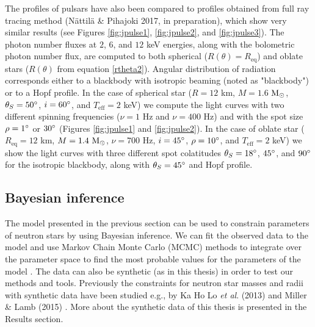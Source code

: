 \documentclass{wihuri}
\def\msun{{\rm M_{\odot}}}
\def\thetas{\theta_{S}}
\def\req{R_{\mathrm{eq}}}
\begin{document}
The profiles of pulsars have also been compared to profiles obtained from full ray tracing method (Nättilä \& Pihajoki 2017, in preparation), which show very similar results (see Figures \ref{fig:jpulse1}, \ref{fig:jpulse2}, and \ref{fig:jpulse3}). %
The photon number fluxes at $2$, $6$, and $12$ keV energies, along with the bolometric photon number flux, are computed to both spherical ($R(\theta) = \req$) and oblate stars ($R(\theta)$ from equation \ref{rtheta2}). Angular distribution of radiation corresponds either to a blackbody with isotropic beaming (noted as "blackbody") or to a Hopf profile. %
In the case of spherical star ($R = 12$ km, $M = 1.6$ $\msun$, $\thetas = 50 \degree$, $i = 60 \degree$, and $T_{\mathrm{eff}} = 2$ keV) we compute the light curves with two different spinning frequencies ($\nu = 1$ Hz and $\nu = 400$ Hz) and with the spot size $\rho = 1 \degree$ or $30 \degree$ (Figures \ref{fig:jpulse1} and \ref{fig:jpulse2}). In the case of oblate star ($\req = 12$ km, $M = 1.4  ~\msun$, $\nu = 700$ Hz, $i = 45 \degree$, $\rho = 10 \degree$, and $T_{\mathrm{eff}} = 2$ keV) we show the light curves with three different spot colatitudes $\thetas  = 18 \degree$,   $45 \degree$, and $90 \degree$ for the isotropic blackbody, along with $\thetas = 45 \degree$ and Hopf profile.









\subsection{Bayesian inference}



The model presented in the previous section can be used to constrain parameters of neutron stars by using Bayesian inference. We can fit the observed data to the model and use Markov Chain Monte Carlo (MCMC) methods to integrate over the parameter space to find the most probable values for the parameters of the model \cite{mc_methods_book}. The data can also be synthetic (as in this thesis) in order to test our methods and tools. %
Previously the constraints for neutron star masses and radii with synthetic data have been studied e.g., by Ka Ho Lo {\it et al}. (2013) \cite{miller} and Miller \& Lamb (2015) \cite{millerlamb2015}. %
More about the synthetic data of this thesis is presented in the Results section. 
\end{document}
